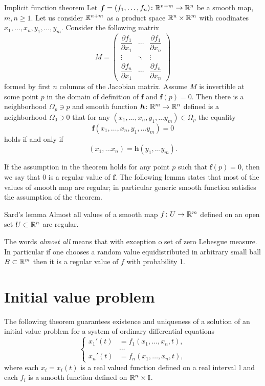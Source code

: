 \begin{thm}{Implicit function theorem}\label{thm:imlicit}
Let $\bm{f}=(f_1,\dots,f_n)\colon\mathbb{R}^{n+m}\to\mathbb{R}^n$ be a smooth map,
$m,n\ge 1$.
Let us consider $\mathbb{R}^{n+m}$ as a product space $\mathbb{R}^n\times \mathbb{R}^m$ with coodinates 
$x_1,\dots,x_n,y_1,\dots,y_m$.
Consider the following matrix 
\[
M=\begin{pmatrix}
\dfrac{\partial f_1}{\partial x_1} & \cdots & \dfrac{\partial f_1}{\partial x_n}\\
\vdots & \ddots & \vdots\\
\dfrac{\partial f_n}{\partial x_1} & \cdots & \dfrac{\partial f_n}{\partial x_n} \end{pmatrix}\]
formed by first $n$ columns of the Jacobian matrix.
Assume $M$ is invertible at some point $p$ in the domain of definition of $\bm{f}$ and $\bm{f}(p)=0$.
Then there is a neighborhood $\Omega_p\ni p$
and smooth function $\bm{h}\colon\mathbb{R}^m\to\mathbb{R}^n$ defined is a neighborhood $\Omega_0\ni 0$ that
for any $(x_1,\dots,x_n,y_1,\dots y_m)\in \Omega_p$ the equality
\[\bm{f}(x_1,\dots,x_n,y_1,\dots y_m)=0\]
holds if and only if 
\[(x_1,\dots x_n)=\bm{h}(y_1,\dots y_m).\]

\end{thm}

If the assumption in the theorem holds for any point $p$ such that $\bm{f}(p)=0$,
then we say that $0$ is a regular value of $\bm{f}$.
The following lemma states that most of the values of smooth map are regular;
in particular generic smooth function satisfies the assumption of the theorem.

\begin{thm}{Sard's lemma}
Almost all values of a smooth map $f\colon U \rightarrow \mathbb{R}^m$ defined on an open set $U\subset \mathbb{R}^n$ are regular.
\end{thm}

The words \emph{almost all} means that with exception o set of zero Lebesgue measure.
In particular if one chooses a random value equidistributed in arbitrary small ball $B\subset \mathbb{R}^m$ then it is a regular value of $f$ with probability 1.






\section{Initial value problem}

The following theorem guarantees existence and uniqueness of a solution of an initial value problem
for a system of ordinary differential equations
\[
\begin{cases}
x_1'(t)&=f_1(x_1,\dots,x_n,t),
\\
&\dots
\\
x_n'(t)&=f_n(x_1,\dots,x_n,t),
\end{cases}
\]
where each $x_i=x_i(t)$ is a real valued function defined on a real interval $\mathbb{I}$
and each $f_i$ is a smooth function defined on $\mathbb{R}^n\times \mathbb{I}$.

